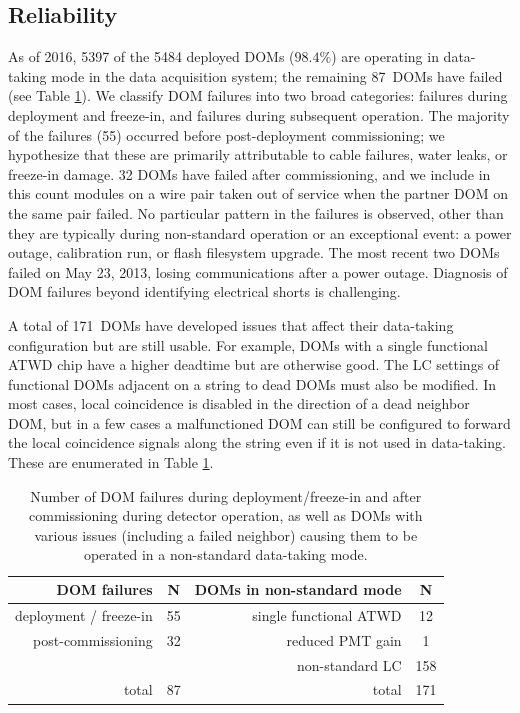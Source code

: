 \subsection{\label{sec:reliability}Reliability}

As of 2016, 5397 of the 5484 deployed DOMs ($98.4\%$) are operating in
data-taking mode in the data acquisition system; the remaining 87~DOMs
have failed (see Table
\ref{tab:dom_failures}).  We classify DOM 
failures into two broad categories: failures during deployment and
freeze-in, and failures during subsequent operation.  The majority of the
failures (55) occurred before post-deployment commissioning; we hypothesize
that these are primarily attributable to cable failures, water leaks,
or freeze-in damage. 32 DOMs have failed after commissioning, and
we include in this count modules on a wire pair taken out of service when
the partner DOM on the same pair failed.  No particular pattern in the
failures is observed, other than they are typically during non-standard
operation or an exceptional event: a power outage, calibration run, or
flash filesystem upgrade.  The most recent two DOMs failed on May 23, 2013,
losing communications after a power outage.  Diagnosis of DOM failures
beyond identifying electrical shorts is challenging.

A total of 171~DOMs have developed issues that affect their data-taking
configuration but are still usable.  For example, DOMs with a single functional
ATWD chip have a higher deadtime but are otherwise good.  The LC settings of functional DOMs adjacent on a string to
dead DOMs must also be modified. In most cases, local coincidence is
disabled in the direction of a dead neighbor DOM, but in a few cases a
malfunctioned DOM can still be configured to forward the local
coincidence signals along the string even if it is not used in
data-taking. These are enumerated in Table \ref{tab:dom_failures}.  

\begin{table}[h]
  \centering
  \caption{Number of DOM failures during deployment/freeze-in and after
    commissioning during detector operation, as well as DOMs with various
    issues (including a failed neighbor) causing them to be operated in a
    non-standard data-taking mode.} 
  \label{tab:dom_failures}
  \begin{tabular}{rc|rc}
    \toprule
    DOM failures & N & DOMs in non-standard mode & N\\
    \hline    
    deployment / freeze-in & 55 &single functional ATWD & 12\\
    post-commissioning & 32  & reduced PMT gain & 1 \\
   & & non-standard LC & 158 \\
 total & 87 & total& 171\\
    \bottomrule 
  \end{tabular}
\end{table}

